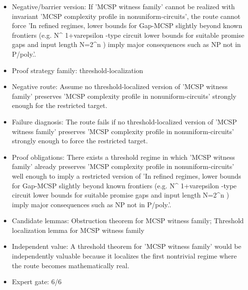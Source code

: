 \documentclass[11pt]{article}
\begin{document}
\begin{itemize}
\item Negative/barrier version: If 'MCSP witness family' cannot be realized with invariant 'MCSP complexity profile in nonuniform-circuits', the route cannot force 'In refined regimes, lower bounds for Gap-MCSP slightly beyond known frontiers (e.g. N\textasciicircum{} 1+varepsilon -type circuit lower bounds for suitable promise gaps and input length N=2\textasciicircum{}n ) imply major consequences such as NP not in P/poly.'.
\item Proof strategy family: threshold-localization
\item Negative route: Assume no threshold-localized version of 'MCSP witness family' preserves 'MCSP complexity profile in nonuniform-circuits' strongly enough for the restricted target.
\item Failure diagnosis: The route fails if no threshold-localized version of 'MCSP witness family' preserves 'MCSP complexity profile in nonuniform-circuits' strongly enough to force the restricted target.
\item Proof obligations: There exists a threshold regime in which 'MCSP witness family' already preserves 'MCSP complexity profile in nonuniform-circuits' well enough to imply a restricted version of 'In refined regimes, lower bounds for Gap-MCSP slightly beyond known frontiers (e.g. N\textasciicircum{} 1+varepsilon -type circuit lower bounds for suitable promise gaps and input length N=2\textasciicircum{}n ) imply major consequences such as NP not in P/poly.'.
\item Candidate lemmas: Obstruction theorem for MCSP witness family; Threshold localization lemma for MCSP witness family
\item Independent value: A threshold theorem for 'MCSP witness family' would be independently valuable because it localizes the first nontrivial regime where the route becomes mathematically real.
\item Expert gate: 6/6
\end{itemize}
\end{document}
